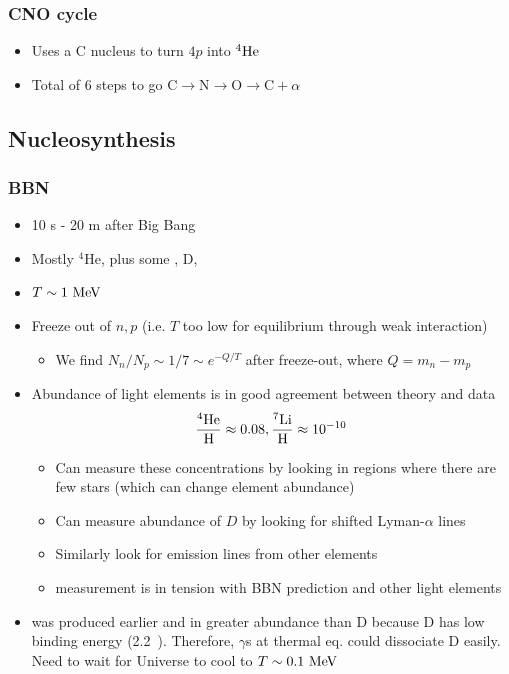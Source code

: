 \subsubsection{CNO cycle}
\begin{itemize}
  \item Uses a C nucleus to turn $4p$ into $^{4}\text{He}$
  \item Total of 6 steps to go $\text{C}\rightarrow\text{N}\rightarrow\text{O}\rightarrow\text{C}+\alpha$
\end{itemize}

\subsection{Nucleosynthesis}
\subsubsection{BBN}
\begin{itemize}
  \item 10 s - 20 m after Big Bang
  \item Mostly $^4$He, plus some , D, 
  \item $T\sim 1~\text{MeV}$
  \item Freeze out of $n,p$ (i.e. $T$ too low for equilibrium through weak interaction)
  \begin{itemize}
    \item We find $N_n/N_p \sim 1/7 \sim e^{-Q/T}$ after freeze-out, where $Q = m_n-m_p$
  \end{itemize}
  \item Abundance of light elements is in good agreement between theory and data
  \begin{equation}
    \frac{^{4}\text{He}}{^{}\text{H}} \approx 0.08, \frac{^{7}\text{Li}}{^{}\text{H}} \approx 10^{-10}
  \end{equation}
  \begin{itemize}
    \item Can measure these concentrations by looking in regions where there are few stars (which can change element abundance)
    \item Can measure abundance of $D$ by looking for shifted Lyman-$\alpha$ lines
    \item Similarly look for emission lines from other elements
    \item {} measurement is in tension with BBN prediction and other light elements
  \end{itemize}
  \item {} was produced earlier and in greater abundance than D because D has low binding energy (2.2~\mev). Therefore, $\gamma$s at thermal eq. could dissociate D easily. Need to wait for Universe to cool to $T\sim 0.1~\text{MeV}$
\end{itemize}

